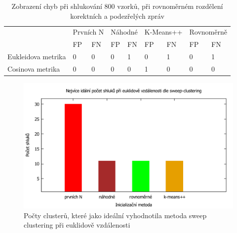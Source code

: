 \documentclass[thesis=M,czech]{FITthesis}[2012/10/20]
\newcommand{\tmpframe}[1]{\fbox{#1}}
\renewcommand{\tmpframe}[1]{#1}
\begin{document}
		\begin{table}[htb]\centering
			\centering
			\caption{Zobrazení chyb při shlukování 800 vzorků, při rovnoměrném rozdělení korektních a podezřelých zpráv}
			\label{tab:clustering_errors}
			\begin{tabular}{|l|l|l|l|l|l|l|l|l|}
				\hline
				\multirow{2}{*}{}  & \multicolumn{2}{l|}{Prvních N}                    & \multicolumn{2}{l|}{Náhodné}                      & \multicolumn{2}{l|}{K-Means++}                    & \multicolumn{2}{l|}{Rovnoměrně}                   \\
				& \multicolumn{1}{l|}{FP} & \multicolumn{1}{l|}{FN} & \multicolumn{1}{l|}{FP} & \multicolumn{1}{l|}{FN} & \multicolumn{1}{l|}{FP} & \multicolumn{1}{l|}{FN} & \multicolumn{1}{l|}{FP} & \multicolumn{1}{l|}{FN} \\ \hline
				Eukleidova metrika & 0                       & 0                       & 0                       & 1                       & 0                       & 1                       & 0                       & 1                       \\ \hline
				Cosinova metrika   & 0                       & 0                       & 0                       & 0                       & 1                       & 0                       & 0                       & 0                       \\ \hline
			\end{tabular}
		\end{table}
	
		\begin{figure}[htb]\centering
			\tmpframe{\includegraphics[width=\textwidth]{./img/euklide-sweep-clusters}}	
			\caption{Počty clusterů, které jako ideální vyhodnotila metoda sweep clustering při euklidově vzdálenosti}
			\label{fig:k-means-num-clusters-euklid}
		\end{figure}
	
\end{document}
